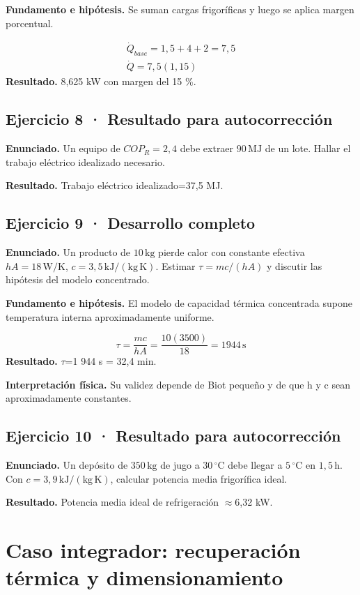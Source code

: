 \documentclass[11pt,a4paper]{article}
\begin{document}
\textbf{Fundamento e hipótesis.} Se suman cargas frigoríficas y luego se aplica margen porcentual.

\[
\begin{gathered}
\dot Q_{base}=1{,}5+4+2=7{,}5\\\dot Q=7{,}5(1{,}15)
\end{gathered}
\]
\textbf{Resultado.} 8,625 kW con margen del 15 \%.


\subsection*{Ejercicio 8 · Resultado para autocorrección}
\textbf{Enunciado.} Un equipo de \(COP_R=2{,}4\) debe extraer \(90\,\mathrm{MJ}\) de un lote. Hallar el trabajo eléctrico idealizado necesario.

\textbf{Resultado.} Trabajo eléctrico idealizado=37,5 MJ.


\subsection*{Ejercicio 9 · Desarrollo completo}
\textbf{Enunciado.} Un producto de \(10\,\mathrm{kg}\) pierde calor con constante efectiva \(hA=18\,\mathrm{W/K}\), \(c=3{,}5\,\mathrm{kJ/(kg\,K)}\). Estimar \(\tau=mc/(hA)\) y discutir las hipótesis del modelo concentrado.

\textbf{Fundamento e hipótesis.} El modelo de capacidad térmica concentrada supone temperatura interna aproximadamente uniforme.

\[
\tau=\frac{mc}{hA}=\frac{10(3500)}{18}=1944\,\mathrm s
\]
\textbf{Resultado.} \ensuremath{\tau}=1 944 s = 32,4 min.

\textbf{Interpretación física.} Su validez depende de Biot pequeño y de que h y c sean aproximadamente constantes.


\subsection*{Ejercicio 10 · Resultado para autocorrección}
\textbf{Enunciado.} Un depósito de \(350\,\mathrm{kg}\) de jugo a \(30\,^\circ\mathrm C\) debe llegar a \(5\,^\circ\mathrm C\) en \(1{,}5\,\mathrm h\). Con \(c=3{,}9\,\mathrm{kJ/(kg\,K)}\), calcular potencia media frigorífica ideal.

\textbf{Resultado.} Potencia media ideal de refrigeración \ensuremath{\approx}6,32 kW.


\clearpage

\section{Caso integrador: recuperación térmica y dimensionamiento}
\end{document}
